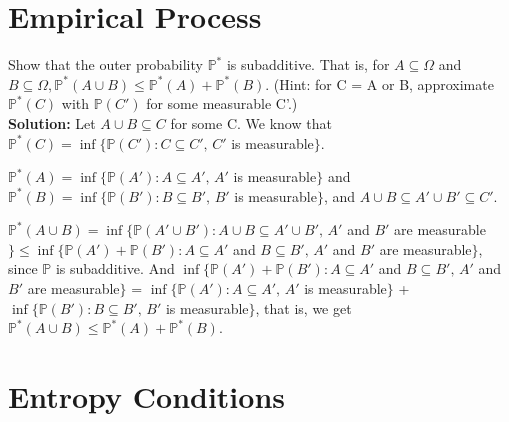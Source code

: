 \documentclass[11pt,letterpaper]{article}                  %
\begin{document}
\bigskip
\begin{problem}

\end{problem}

\section{Empirical Process}

\begin{problem} Show that the outer probability $\mathbb{P}^*$ is subadditive. That is, for $A \subseteq \Omega$ and $B \subseteq \Omega, \mathbb{P}^*(A \cup B) \leq \mathbb{P}^*(A) + \mathbb{P}^*(B)$. (Hint: for C = A or B, approximate $\mathbb{P}^*(C)$ with $\mathbb{P}(C')$ for some measurable C'.) \\
	
	\textbf{Solution:}  Let $A \cup B \subseteq C$ for some C. We know that $\mathbb{P}^*(C) = \inf \{\mathbb{P}(C'): C \subseteq C', \, C'$ is measurable$\}$. 
	
	$\mathbb{P}^*(A) = \inf \{\mathbb{P}(A'): A \subseteq A', \, A'$ is measurable$\}$ and $\mathbb{P}^*(B) = \inf \{\mathbb{P}(B'): B \subseteq B', \, B'$ is measurable$\}$, and $A \cup B \subseteq A' \cup B' \subseteq C'$. 
	
	$\mathbb{P}^*(A \cup B) = \inf \{\mathbb{P}(A' \cup B'): A \cup B \subseteq A' \cup B', \, A'$ and $B'$ are measurable$\} \leq \inf \{\mathbb{P}(A') +  \mathbb{P}(B'): A \subseteq A'$ and $B \subseteq B', \, A'$ and $B'$ are measurable$\}$, since $\mathbb{P}$ is subadditive. And $\inf \{\mathbb{P}(A') +  \mathbb{P}(B'): A \subseteq A'$ and $B \subseteq B', \, A'$ and $B'$ are measurable$\}$ = $\inf \{\mathbb{P}(A'): A \subseteq A', \, A'$ is measurable$\}$ + $\inf \{\mathbb{P}(B'): B \subseteq B', \, B'$ is measurable$\}$, that is, we get $\mathbb{P}^*(A \cup B) \leq \mathbb{P}^*(A) + \mathbb{P}^*(B)$.
\end{problem}

\bigskip
\begin{problem}

\end{problem}

\bigskip
\section{Entropy Conditions}
\end{document}
